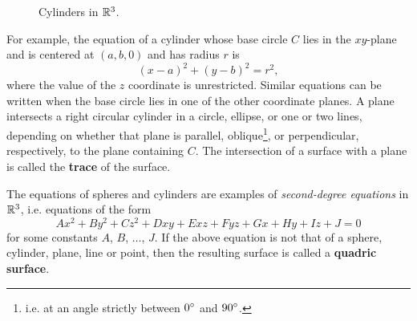 \begin{figure}[h]
{\begin{tikzpicture}
 \end{tikzpicture}}
 \qquad\qquad
 \caption[]{\quad Cylinders in $\Real{3}$.}
 \label{fig:cyls}
\end{figure}

For example, the equation of a cylinder whose base circle $C$ lies in the $xy$-plane and is centered at $(a,b,0)$ and
has radius $r$ is
\begin{equation}\label{eqn:cylxy}
 (x - a)^2 + (y - b)^2 = r^2,
\end{equation}
where the value of the $z$ coordinate is unrestricted. Similar equations can be written when the base circle
lies in one of the other coordinate planes.
A plane intersects a right circular cylinder in a circle, ellipse, or one or two lines,
depending on whether that plane is parallel, oblique\footnote{i.e. at an angle strictly between $0\Degrees$ and
$90\Degrees$.}, or perpendicular, respectively, to the plane containing $C$.
The intersection of a surface with a plane is called the \textbf{trace} of the surface.

The equations of spheres and cylinders are examples of \emph{second-degree equations}
in $\Real{3}$, i.e. equations of the form
\begin{equation}\label{eqn:quadric}
 Ax^2 + By^2 + Cz^2 + Dxy + Exz + Fyz + Gx + Hy + Iz + J = 0
\end{equation}
for some constants $A$, $B$, $\dots$, $J$. If the above equation is
not that of a sphere, cylinder, plane, line or point, then the resulting surface is called a
\textbf{quadric surface}.

